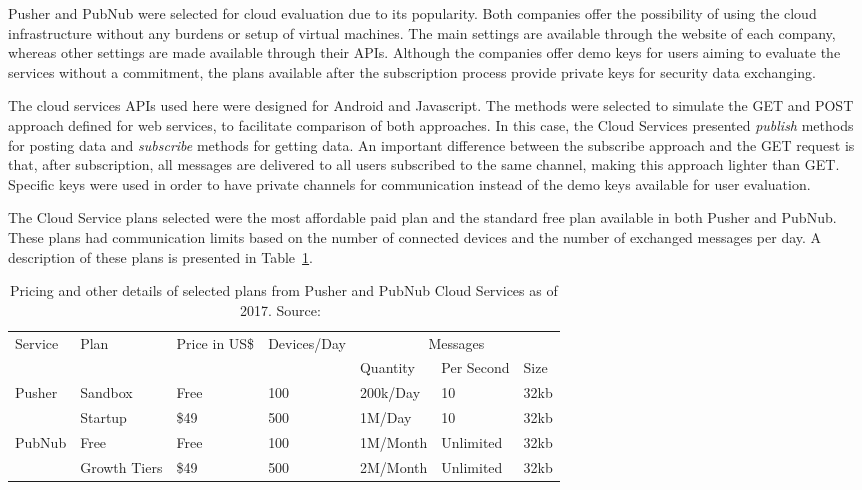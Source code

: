 Pusher and PubNub were selected for cloud evaluation due to its popularity.
Both companies offer the possibility of using the cloud infrastructure without any burdens or setup of virtual machines.
The main settings are available through the website of each company, whereas other settings are made available through their APIs.
Although the companies offer demo keys for users aiming to evaluate the services without a commitment, the plans available after the subscription process provide private keys for security data exchanging. 

The cloud services APIs used here were designed for Android and Javascript.
The methods were selected to simulate the GET and POST approach defined for web services, to facilitate comparison of both approaches.
In this case, the Cloud Services presented \emph{publish} methods for posting data and \emph{subscribe} methods for getting data.
An important difference between the subscribe approach and the GET request is that, after subscription, all messages are delivered to all users subscribed to the same channel, making this approach lighter than GET. 
Specific keys were used in order to have private channels for communication instead of the demo keys available for user evaluation.

The Cloud Service plans selected were the most affordable paid plan and the standard free plan available in both Pusher and PubNub.
These plans had communication limits based on the number of connected devices and the number of exchanged messages per day.
A description of these plans is presented in Table~\ref{tab:pusherpubnubplans}.


\begin{table}[]
\centering
\caption{Pricing and other details of selected plans from Pusher and PubNub Cloud Services as of 2017. Source:~\cite{Pusher2017website,PubNub2017website}}
\label{tab:pusherpubnubplans}
\begin{tabular}{l|llllll}
Service & Plan         & Price in US\$ & Devices/Day & \multicolumn{3}{c}{Messages} \\ \cline{5-7} 
        &              &               &             & Quantity & Per Second & Size \\ \hline
Pusher  & Sandbox      & Free          & 100         & 200k/Day &    10      & 32kb \\ \cline{2-7} 
        & Startup      & \$49          & 500         & 1M/Day   &    10      & 32kb \\ \hline
PubNub  & Free         & Free          & 100         & 1M/Month & Unlimited  & 32kb \\ \cline{2-7} 
        & Growth Tiers & \$49          & 500         & 2M/Month & Unlimited  & 32kb \\ \hline
\end{tabular}
\end{table}

